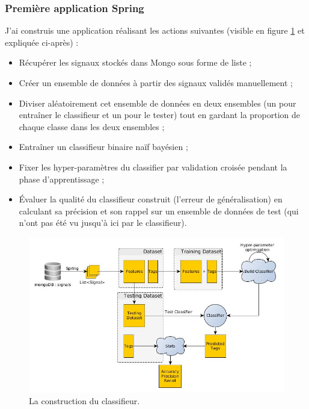             \subsubsection{Première application Spring}
                J'ai construis une application réalisant les actions suivantes (visible en figure \ref{fig:classif_building} et expliquée ci-après) :
            \begin{itemize}
                \item Récupérer les signaux stockés dans Mongo sous forme de liste ;
                \item Créer un ensemble de données à partir des signaux validés manuellement ;
                \item Diviser aléatoirement cet ensemble de données en deux ensembles (un pour entraîner le classifieur et un pour le tester) tout en gardant la proportion de chaque classe dans les deux ensembles ;
                \item Entraîner un classifieur binaire naïf bayésien ;
                \item Fixer les hyper-paramètres du classifier par validation croisée pendant la phase d'apprentissage ;
                \item Évaluer la qualité du classifieur construit (l'erreur de généralisation) en calculant sa précision et son rappel sur un ensemble de données de test (qui n'ont pas \og été vu \fg jusqu'à ici par le classifieur).
            \end{itemize}

            \begin{figure}[h!]
                \centering
                \includegraphics[width=\textwidth]{images/classifier_building.jpg}
                \caption{La construction du classifieur.}
                \label{fig:classif_building}
            \end{figure}

